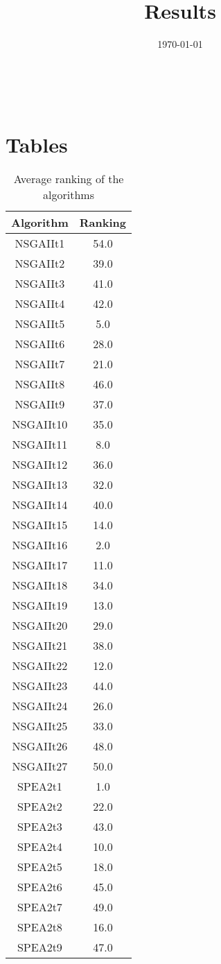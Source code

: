 \documentclass{article}
\title{Results}
\author{}
\date{\today}
\begin{document}
\oddsidemargin 0in \topmargin 0in\maketitle
\
\section{Tables}
\begin{table}[!htp]
\centering
\caption{Average ranking of the algorithms}
\begin{tabular}{c|c}
Algorithm&Ranking\\
\hline
NSGAIIt1&54.0\\
NSGAIIt2&39.0\\
NSGAIIt3&41.0\\
NSGAIIt4&42.0\\
NSGAIIt5&5.0\\
NSGAIIt6&28.0\\
NSGAIIt7&21.0\\
NSGAIIt8&46.0\\
NSGAIIt9&37.0\\
NSGAIIt10&35.0\\
NSGAIIt11&8.0\\
NSGAIIt12&36.0\\
NSGAIIt13&32.0\\
NSGAIIt14&40.0\\
NSGAIIt15&14.0\\
NSGAIIt16&2.0\\
NSGAIIt17&11.0\\
NSGAIIt18&34.0\\
NSGAIIt19&13.0\\
NSGAIIt20&29.0\\
NSGAIIt21&38.0\\
NSGAIIt22&12.0\\
NSGAIIt23&44.0\\
NSGAIIt24&26.0\\
NSGAIIt25&33.0\\
NSGAIIt26&48.0\\
NSGAIIt27&50.0\\
SPEA2t1&1.0\\
SPEA2t2&22.0\\
SPEA2t3&43.0\\
SPEA2t4&10.0\\
SPEA2t5&18.0\\
SPEA2t6&45.0\\
SPEA2t7&49.0\\
SPEA2t8&16.0\\
SPEA2t9&47.0\\

\end{tabular}
\end{table}
\end{document}
